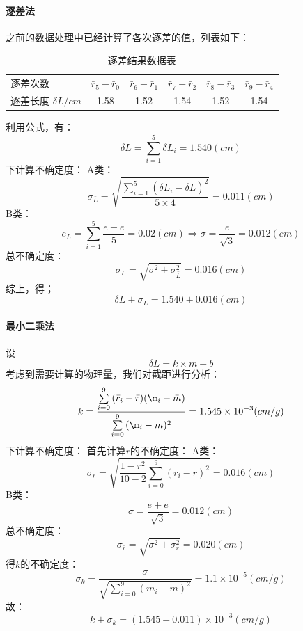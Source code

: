 \documentclass{ctexart}
\begin{document}
\paragraph{逐差法}之前的数据处理中已经计算了各次逐差的值，列表如下：
\begin{table}[htbp]
  \centering
  \caption{逐差结果数据表}
    \begin{tabular}{lccccc}
    逐差次数  & \multicolumn{1}{l}{$\bar{r}_5-\bar{r}_0$} & \multicolumn{1}{l}{$\bar{r}_6-\bar{r}_1$} & \multicolumn{1}{l}{$\bar{r}_7-\bar{r}_2$} & \multicolumn{1}{l}{$\bar{r}_8-\bar{r}_3$} & \multicolumn{1}{l}{$\bar{r}_9-\bar{r}_4$} \\
    逐差长度 $\delta L/cm$ & 1.58  & 1.52  & 1.54  & 1.52  & 1.54  \\
    \end{tabular}%
  \label{tab:addlabel}%
\end{table}%

利用公式，有：
$$\delta L=\sum_{i=1}^5{\delta L_i}=1.540(cm)$$
下计算不确定度：
A类：$$\sigma_{\bar{L}}=\sqrt{\frac{\sum\limits_{i=1}^5{(\delta L_i-\overline{\delta L})^2}}{5\times4}}=0.011(cm)$$
B类：$$e_L=\sum\limits_{i=1}^5{\frac{e+e}5}=0.02(cm)\Rightarrow \sigma=\frac{e}{\sqrt{3}}=0.012(cm)$$
总不确定度：$$\sigma_L=\sqrt{\sigma^2+\sigma_{\bar{L}}^2}=0.016(cm)$$
综上，得；$$\delta L\pm \sigma_L=1.540\pm 0.016(cm)$$
\paragraph{最小二乘法}
设$$\delta L=k\times m+b$$
考虑到需要计算的物理量，我们对截距进行分析：
$$k=\frac{\sum\limits_{i=0}^9{(\bar{r}_i-\bar{r})(\m_i-\bar{m})}}{\sum\limits_{i=0}^9{(\m_i-\bar{m})^2}}=1.545\times 10^{-3}(cm/g)$$
下计算不确定度：
首先计算$\bar{r}$的不确定度：
A类：$$\sigma_r =\sqrt{\frac{1-r^2}{10-2}\sum\limits_{i=0}^9{(\bar{r}_i-\bar{r})^2}}=0.016(cm)$$
B类：$$\sigma=\frac{e+e}{\sqrt{3}}=0.012(cm)$$
总不确定度：$$\sigma_{\bar{r}}=\sqrt{\sigma^2+\sigma_r^2}=0.020(cm)$$
得$k$的不确定度：
$$\sigma_k=\frac{\sigma}{\sqrt{\sum\limits_{i=0}^9{(m_i-\bar{m})^2}}}=1.1\times10^{-5}(cm/g)$$
故：
$$k\pm \sigma_k=(1.545\pm 0.011  )\times 10^{-3}(cm/g)$$
\end{document}
